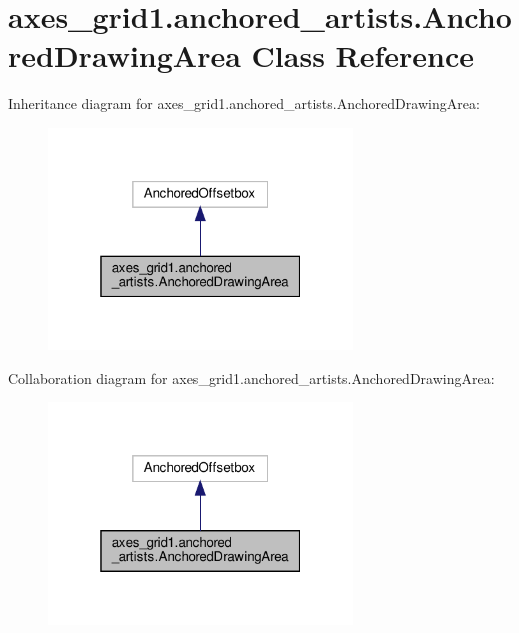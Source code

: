 \hypertarget{classaxes__grid1_1_1anchored__artists_1_1AnchoredDrawingArea}{}\section{axes\+\_\+grid1.\+anchored\+\_\+artists.\+Anchored\+Drawing\+Area Class Reference}
\label{classaxes__grid1_1_1anchored__artists_1_1AnchoredDrawingArea}


Inheritance diagram for axes\+\_\+grid1.\+anchored\+\_\+artists.\+Anchored\+Drawing\+Area\+:
\nopagebreak
\begin{figure}[H]
\begin{center}
\leavevmode
\includegraphics[width=229pt]{classaxes__grid1_1_1anchored__artists_1_1AnchoredDrawingArea__inherit__graph}
\end{center}
\end{figure}


Collaboration diagram for axes\+\_\+grid1.\+anchored\+\_\+artists.\+Anchored\+Drawing\+Area\+:
\nopagebreak
\begin{figure}[H]
\begin{center}
\leavevmode
\includegraphics[width=229pt]{classaxes__grid1_1_1anchored__artists_1_1AnchoredDrawingArea__coll__graph}
\end{center}
\end{figure}
